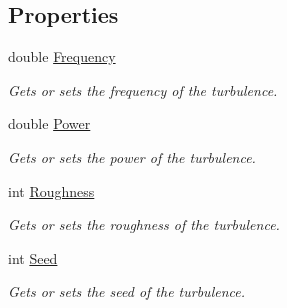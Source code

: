 \subsection*{Properties}
\begin{DoxyCompactItemize}
\item 
double \hyperlink{class_lib_noise_1_1_operator_1_1_turbulence_a8ed1322da08648a18649e4b6b387c964}{Frequency}
\begin{DoxyCompactList}\small\item\em Gets or sets the frequency of the turbulence. \end{DoxyCompactList}\item 
double \hyperlink{class_lib_noise_1_1_operator_1_1_turbulence_a77cfb87023b016875e28b7bd4e3092e1}{Power}
\begin{DoxyCompactList}\small\item\em Gets or sets the power of the turbulence. \end{DoxyCompactList}\item 
int \hyperlink{class_lib_noise_1_1_operator_1_1_turbulence_a948396ae7e3e1351030aad835ce4d94e}{Roughness}
\begin{DoxyCompactList}\small\item\em Gets or sets the roughness of the turbulence. \end{DoxyCompactList}\item 
int \hyperlink{class_lib_noise_1_1_operator_1_1_turbulence_a03f22847ef7b1535886bfce58d23475e}{Seed}
\begin{DoxyCompactList}\small\item\em Gets or sets the seed of the turbulence. \end{DoxyCompactList}\end{DoxyCompactItemize}
